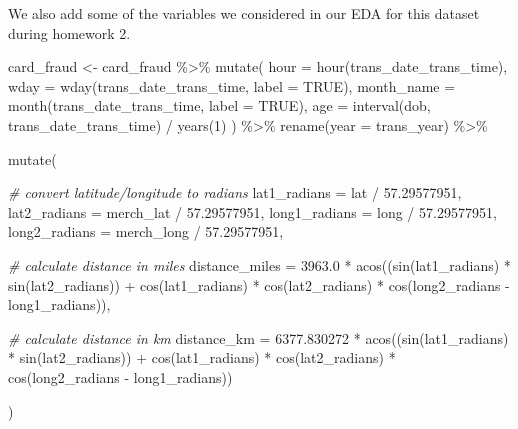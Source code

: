 \documentclass[
]{article}
\newenvironment{Shaded}{\begin{snugshade}}{\end{snugshade}}
\newcommand{\AttributeTok}[1]{\textcolor[rgb]{0.77,0.63,0.00}{#1}}
\newcommand{\CommentTok}[1]{\textcolor[rgb]{0.56,0.35,0.01}{\textit{#1}}}
\newcommand{\ConstantTok}[1]{\textcolor[rgb]{0.00,0.00,0.00}{#1}}
\newcommand{\DecValTok}[1]{\textcolor[rgb]{0.00,0.00,0.81}{#1}}
\newcommand{\FloatTok}[1]{\textcolor[rgb]{0.00,0.00,0.81}{#1}}
\newcommand{\FunctionTok}[1]{\textcolor[rgb]{0.00,0.00,0.00}{#1}}
\newcommand{\NormalTok}[1]{#1}
\newcommand{\OtherTok}[1]{\textcolor[rgb]{0.56,0.35,0.01}{#1}}
\newcommand{\SpecialCharTok}[1]{\textcolor[rgb]{0.00,0.00,0.00}{#1}}
\begin{document}
We also add some of the variables we considered in our EDA for this
dataset during homework 2.

\begin{Shaded}
\begin{Highlighting}[]
\NormalTok{card\_fraud }\OtherTok{\textless{}{-}}\NormalTok{ card\_fraud }\SpecialCharTok{\%\textgreater{}\%} 
  \FunctionTok{mutate}\NormalTok{( }\AttributeTok{hour =} \FunctionTok{hour}\NormalTok{(trans\_date\_trans\_time),}
          \AttributeTok{wday =} \FunctionTok{wday}\NormalTok{(trans\_date\_trans\_time, }\AttributeTok{label =} \ConstantTok{TRUE}\NormalTok{),}
          \AttributeTok{month\_name =} \FunctionTok{month}\NormalTok{(trans\_date\_trans\_time, }\AttributeTok{label =} \ConstantTok{TRUE}\NormalTok{),}
          \AttributeTok{age =} \FunctionTok{interval}\NormalTok{(dob, trans\_date\_trans\_time) }\SpecialCharTok{/} \FunctionTok{years}\NormalTok{(}\DecValTok{1}\NormalTok{)}
\NormalTok{) }\SpecialCharTok{\%\textgreater{}\%} 
  \FunctionTok{rename}\NormalTok{(}\AttributeTok{year =}\NormalTok{ trans\_year) }\SpecialCharTok{\%\textgreater{}\%} 
  
  \FunctionTok{mutate}\NormalTok{(}
    
    \CommentTok{\# convert latitude/longitude to radians}
    \AttributeTok{lat1\_radians =}\NormalTok{ lat }\SpecialCharTok{/} \FloatTok{57.29577951}\NormalTok{,}
    \AttributeTok{lat2\_radians =}\NormalTok{ merch\_lat }\SpecialCharTok{/} \FloatTok{57.29577951}\NormalTok{,}
    \AttributeTok{long1\_radians =}\NormalTok{ long }\SpecialCharTok{/} \FloatTok{57.29577951}\NormalTok{,}
    \AttributeTok{long2\_radians =}\NormalTok{ merch\_long }\SpecialCharTok{/} \FloatTok{57.29577951}\NormalTok{,}
    
    \CommentTok{\# calculate distance in miles}
    \AttributeTok{distance\_miles =} \FloatTok{3963.0} \SpecialCharTok{*} \FunctionTok{acos}\NormalTok{((}\FunctionTok{sin}\NormalTok{(lat1\_radians) }\SpecialCharTok{*} \FunctionTok{sin}\NormalTok{(lat2\_radians)) }\SpecialCharTok{+} \FunctionTok{cos}\NormalTok{(lat1\_radians) }\SpecialCharTok{*} \FunctionTok{cos}\NormalTok{(lat2\_radians) }\SpecialCharTok{*} \FunctionTok{cos}\NormalTok{(long2\_radians }\SpecialCharTok{{-}}\NormalTok{ long1\_radians)),}

    \CommentTok{\# calculate distance in km}
    \AttributeTok{distance\_km =} \FloatTok{6377.830272} \SpecialCharTok{*} \FunctionTok{acos}\NormalTok{((}\FunctionTok{sin}\NormalTok{(lat1\_radians) }\SpecialCharTok{*} \FunctionTok{sin}\NormalTok{(lat2\_radians)) }\SpecialCharTok{+} \FunctionTok{cos}\NormalTok{(lat1\_radians) }\SpecialCharTok{*} \FunctionTok{cos}\NormalTok{(lat2\_radians) }\SpecialCharTok{*} \FunctionTok{cos}\NormalTok{(long2\_radians }\SpecialCharTok{{-}}\NormalTok{ long1\_radians))}

\NormalTok{  )}
\end{Highlighting}
\end{Shaded}
\end{document}
